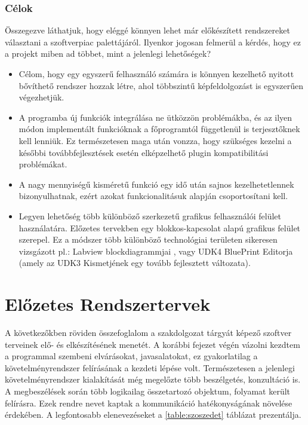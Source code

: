 \documentclass[a4paper,12pt,oneside]{report}
\begin{document}
\subsubsection{Célok}
Összegezve láthatjuk, hogy eléggé könnyen lehet már előkészített rendszereket választani a szoftverpiac palettájáról. Ilyenkor jogosan felmerül a kérdés, hogy ez a projekt miben ad többet, mint a jelenlegi lehetőségek? 
\begin{itemize}
\item Célom, hogy egy egyszerű felhasználó számára is könnyen kezelhető nyitott bővíthető rendszer hozzak létre, ahol többszintű képfeldolgozást is egyszerűen végezhetjük.

\item A programba új funkciók integrálása ne ütközzön problémákba, és az ilyen módon implementált funkcióknak a főprogramtól függetlenül is terjesztőknek kell lenniük. Ez természetesen maga után vonzza, hogy szükséges kezelni a későbbi továbbfejlesztések esetén elképzelhető plugin kompatibilitási problémákat.

\item A nagy mennyiségű kisméretű funkció egy idő után sajnos kezelhetetlennek bizonyulhatnak, ezért azokat funkcionalitásuk alapján csoportosítani kell. 

\item Legyen lehetőség több különböző szerkezetű grafikus felhasználói felület használatára. Előzetes tervekben egy blokkos-kapcsolat alapú grafikus felület szerepel. Ez a módszer több különböző technológiai területen sikeresen vizsgázott pl.: Labview blockdiagrammjai \cite{website:ni_blocks}, vagy UDK4 BluePrint Editorja\cite{website:udk_blueprint} (amely az UDK3 Kismetjének egy tovább fejlesztett változata).
\end{itemize}

\section{Előzetes Rendszertervek}
A következőkben röviden összefoglalom a szakdolgozat tárgyát képező szoftver terveinek elő- és elkészítésének menetét. A korábbi fejezet végén vázolni kezdtem a programmal szembeni elvárásokat, javasalatokat, ez gyakorlatilag a követelményrendszer felírásának a kezdeti lépése volt. Természetesen a jelenlegi követelményrendszer kialakítását még megelőzte több beszélgetés, konzultáció is.\\
A megbeszélések során több logikailag összetartozó objektum, folyamat került felírásra. Ezek rendre nevet kaptak a kommunikáció hatékonyságának növelése érdekében. A legfontosabb elenevezéseket a \ref{table:szoszedet} táblázat prezentálja.
\end{document}
